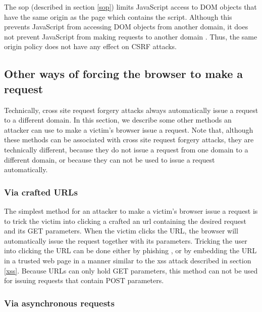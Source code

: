 The \gls{sop} (described in section \ref{sop}) limits JavaScript access to DOM objects that have the same origin as the page which contains the script. Although this prevents JavaScript from accessing DOM objects from another domain, it does not prevent JavaScript from making requests to another domain \cite{DeRyck2010}. Thus, the same origin policy does not have any effect on CSRF attacks.

\subsection{Other ways of forcing the browser to make a request}\label{other-browser-requests}

Technically, cross site request forgery attacks always automatically issue a request to a different domain. In this section, we describe some other methods an attacker can use to make a victim's browser issue a request. Note that, although these methods can be associated with cross site request forgery attacks, they are technically different, because they do not issue a request from one domain to a different domain, or because they can not be used to issue a request automatically.

\subsubsection{Via crafted URLs}

The simplest method for an attacker to make a victim's browser issue a request is to trick the victim into clicking a crafted an \gls{url} containing the desired request and its GET parameters. When the victim clicks the URL, the browser will automatically issue the request together with its parameters. Tricking the user into clicking the URL can be done either by \gls{phishing} \cite{Dhamija2006}, or by embedding the URL in a trusted web page in a manner similar to the \gls{xss} attack described in section \ref{xss}. Because URLs can only hold GET parameters, this method can not be used for issuing requests that contain POST parameters.

\subsubsection{Via asynchronous requests}\label{asynch}

